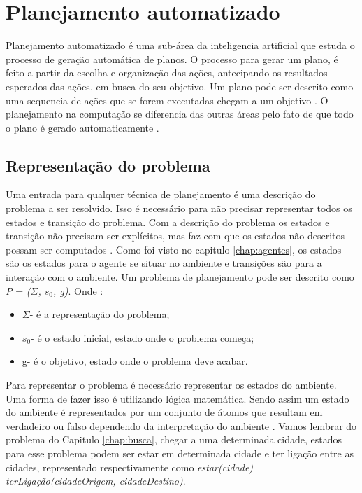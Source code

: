 \chapter{\label{chap:planejamento}Planejamento automatizado}

Planejamento automatizado é uma sub-área da inteligencia artificial que estuda o processo de geração automática de planos. O processo para gerar um plano, é feito a partir da escolha e organização das ações, antecipando os resultados esperados das ações, em busca do seu objetivo. Um plano pode ser descrito como uma sequencia de ações que se forem executadas chegam a um objetivo \cite{ghallab2004automated}. O planejamento na computação se diferencia das outras áreas pelo fato de que todo o plano é gerado automaticamente \cite{intelligence2003modern}. 

\section{Representação do problema}
Uma entrada para qualquer técnica de planejamento é uma descrição do problema a ser resolvido. Isso é necessário para não precisar representar todos os estados e transição do problema. Com a descrição do problema os estados e transição não precisam ser explícitos, mas faz com que os estados não descritos possam ser computados \cite{ghallab2004automated}. Como foi visto no capitulo \ref{chap:agentes}, os estados são os estados para o agente se situar no ambiente e transições são para a interação com o ambiente. Um problema de planejamento pode ser descrito como \textit{P} = \textit{($\Sigma$, $s_{0}$, g)}. Onde \cite{ghallab2004automated}:

\begin{itemize}
	\item $\Sigma$- é a representação do problema;
	\item $s_{0}$- é o estado inicial, estado onde o problema começa;
	\item g- é o objetivo, estado onde o problema deve acabar.
\end{itemize}

Para representar o problema é necessário representar os estados do ambiente. Uma forma de fazer isso é utilizando lógica matemática. Sendo assim um estado do ambiente é representados por um conjunto de átomos que resultam em verdadeiro ou falso dependendo da interpretação do ambiente \cite{ghallab2004automated}. Vamos lembrar do problema do Capitulo \ref{chap:busca}, chegar a uma determinada cidade, estados para esse problema podem ser estar em determinada cidade e ter ligação entre as cidades, representado respectivamente como \textit{estar(cidade)} \textit{terLigação(cidadeOrigem, cidadeDestino)}.   

